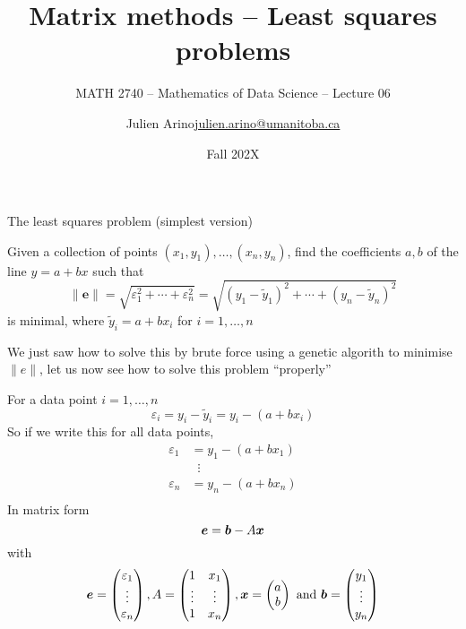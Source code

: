 \documentclass[aspectratio=169]{beamer}\usepackage[]{graphicx}\usepackage[]{xcolor}
\subtitle{MATH 2740 -- Mathematics of Data Science -- Lecture 06}
\author{\texorpdfstring{Julien Arino\newline\url{julien.arino@umanitoba.ca}}{Julien Arino}}
\institute{Department of Mathematics @ University of Manitoba}
\date{Fall 202X}
\title{Matrix methods -- Least squares problems}
\begin{document}



\begin{frame}{The least squares problem (simplest version)}
	\begin{definition}
		Given a collection of points $(x_1,y_1),\ldots,(x_n,y_n)$, find the coefficients $a,b$ of the line $y=a+bx$ such that
		$$
		\|\mathbf{e}\|=\sqrt{\varepsilon_1^2+\cdots+\varepsilon_n^2}
		=\sqrt{(y_1-\tilde y_1)^2+\cdots+(y_n-\tilde y_n)^2}
		$$
		is minimal, where $\tilde y_i=a+bx_i$ for $i=1,\ldots,n$
	\end{definition}
	\vfill
	We just saw how to solve this by brute force using a genetic algorith to minimise $\|e\|$, let us now see how to solve this problem ``properly''
\end{frame}


\begin{frame}
	For a data point $i=1,\ldots,n$
	\[
	\varepsilon_i = y_i-\tilde y_i = y_i - (a+bx_i)
	\]
	So if we write this for all data points,
	\begin{align*}
	\varepsilon_1 &= y_1 - (a+bx_1) \\
	&\;\;\vdots \\
	\varepsilon_n &= y_n - (a+bx_n) \\
	\end{align*}
	In matrix form
	\[
	\bm{e} = \bm{b}-A\bm{x}
	\]
	with
	\[
	\bm{e} = \begin{pmatrix}
	\varepsilon_1\\ \vdots\\ \varepsilon_n
	\end{pmatrix},
	A=\begin{pmatrix}
	1 & x_1 \\ \vdots & \vdots \\ 1 & x_n
	\end{pmatrix},
	\bm{x} = \begin{pmatrix}
	a\\b
	\end{pmatrix}\textrm{ and }
	\bm{b} = \begin{pmatrix}
	y_1\\ \vdots\\ y_n
	\end{pmatrix}
	\]
\end{frame}
\end{document}
